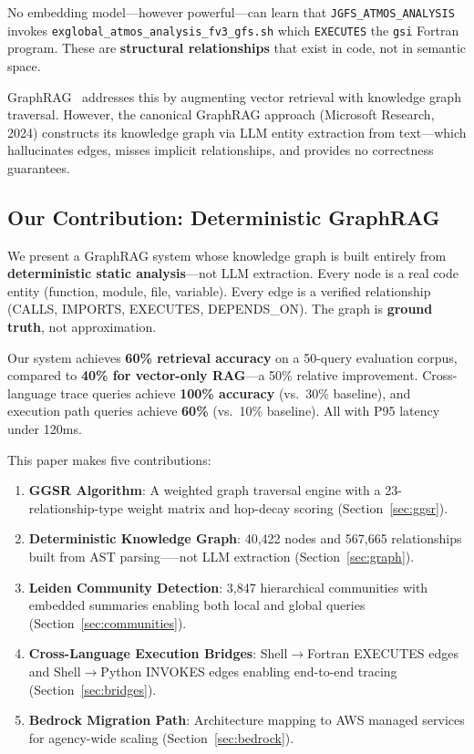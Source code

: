 \documentclass[11pt,letterpaper]{article}
\begin{document}
No embedding model---however powerful---can learn that
\texttt{JGFS\_ATMOS\_ANALYSIS} invokes \texttt{exglobal\_atmos\_analysis\_fv3\_gfs.sh}
which \texttt{EXECUTES} the \texttt{gsi} Fortran program. These are
\textbf{structural relationships} that exist in code, not in semantic
space.

GraphRAG~\cite{edge2024graphrag} addresses this by augmenting vector
retrieval with knowledge graph traversal. However, the canonical
GraphRAG approach (Microsoft Research, 2024) constructs its knowledge
graph via LLM entity extraction from text---which hallucinates edges,
misses implicit relationships, and provides no correctness guarantees.

\subsection{Our Contribution: Deterministic GraphRAG}

We present a GraphRAG system whose knowledge graph is built entirely
from \textbf{deterministic static analysis}---not LLM extraction.
Every node is a real code entity (function, module, file, variable).
Every edge is a verified relationship (CALLS, IMPORTS, EXECUTES,
DEPENDS\_ON). The graph is \textbf{ground truth}, not approximation.

\begin{keyresult}
Our system achieves \textbf{60\% retrieval accuracy} on a 50-query
evaluation corpus, compared to \textbf{40\% for vector-only RAG}---a
50\% relative improvement. Cross-language trace queries achieve
\textbf{100\% accuracy} (vs.\ 30\% baseline), and execution path
queries achieve \textbf{60\%} (vs.\ 10\% baseline). All with P95
latency under 120ms.
\end{keyresult}

This paper makes five contributions:

\begin{enumerate}[nosep]
    \item \textbf{GGSR Algorithm}: A weighted graph traversal engine with
          a 23-relationship-type weight matrix and hop-decay scoring
          (Section~\ref{sec:ggsr}).
    \item \textbf{Deterministic Knowledge Graph}: 40,422 nodes and
          567,665 relationships built from AST parsing-----not LLM
          extraction (Section~\ref{sec:graph}).
    \item \textbf{Leiden Community Detection}: 3,847 hierarchical
          communities with embedded summaries enabling both local and
          global queries (Section~\ref{sec:communities}).
    \item \textbf{Cross-Language Execution Bridges}: Shell$\to$Fortran
          EXECUTES edges and Shell$\to$Python INVOKES edges enabling
          end-to-end tracing (Section~\ref{sec:bridges}).
    \item \textbf{Bedrock Migration Path}: Architecture mapping to AWS
          managed services for agency-wide scaling
          (Section~\ref{sec:bedrock}).
\end{enumerate}
\end{document}
